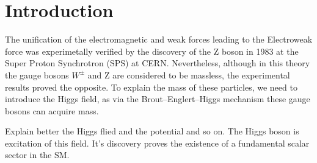 \section{Introduction} \label{intro}

The unification of the electromagnetic and weak forces leading to the Electroweak force was experimetally verified by the discovery of the Z boson in 1983 at the Super Proton Synchrotron (SPS) at CERN. Nevertheless, although in this theory the gauge bosons $W^\pm$ and Z are considered to be massless, the experimental results proved the opposite. To explain the mass of these particles, we need to introduce the Higgs field, as via the Brout–Englert–Higgs mechanism these gauge bosons can acquire mass.

Explain better the Higgs flied and the potential and so on. The Higgs boson is excitation of this field. It's discovery proves the existence of a fundamental scalar sector in the SM.

